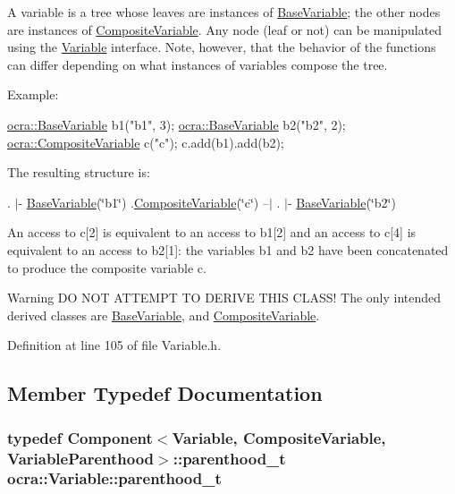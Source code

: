 A variable is a tree whose leaves are instances of \hyperlink{classocra_1_1BaseVariable}{Base\+Variable}; the other nodes are instances of \hyperlink{classocra_1_1CompositeVariable}{Composite\+Variable}. Any node (leaf or not) can be manipulated using the \hyperlink{classocra_1_1Variable}{Variable} interface. Note, however, that the behavior of the functions can differ depending on what instances of variables compose the tree.

Example\+: 
\begin{DoxyCode}
\hyperlink{classocra_1_1BaseVariable}{ocra::BaseVariable} b1(\textcolor{stringliteral}{"b1"}, 3);
\hyperlink{classocra_1_1BaseVariable}{ocra::BaseVariable} b2(\textcolor{stringliteral}{"b2"}, 2);
\hyperlink{classocra_1_1CompositeVariable}{ocra::CompositeVariable} c(\textcolor{stringliteral}{"c"});
c.add(b1).add(b2);
\end{DoxyCode}
 The resulting structure is\+:

. $\vert$-\/ \hyperlink{classocra_1_1BaseVariable}{Base\+Variable}(\char`\"{}b1\char`\"{}) .\hyperlink{classocra_1_1CompositeVariable}{Composite\+Variable}(\char`\"{}c\char`\"{}) --$\vert$ . $\vert$-\/ \hyperlink{classocra_1_1BaseVariable}{Base\+Variable}(\char`\"{}b2\char`\"{})

An access to c\mbox{[}2\mbox{]} is equivalent to an access to b1\mbox{[}2\mbox{]} and an access to c\mbox{[}4\mbox{]} is equivalent to an access to b2\mbox{[}1\mbox{]}\+: the variables b1 and b2 have been concatenated to produce the composite variable c.

\begin{DoxyWarning}{Warning}
DO N\+OT A\+T\+T\+E\+M\+PT TO D\+E\+R\+I\+VE T\+H\+IS C\+L\+A\+S\+S! The only intended derived classes are \hyperlink{classocra_1_1BaseVariable}{Base\+Variable}, and \hyperlink{classocra_1_1CompositeVariable}{Composite\+Variable}. 
\end{DoxyWarning}


Definition at line 105 of file Variable.\+h.



\subsection{Member Typedef Documentation}
\subsubsection[{\texorpdfstring{parenthood\+\_\+t}{parenthood_t}}]{\setlength{\rightskip}{0pt plus 5cm}typedef {\bf Component}$<${\bf Variable}, {\bf Composite\+Variable}, {\bf Variable\+Parenthood}$>$\+::{\bf parenthood\+\_\+t} {\bf ocra\+::\+Variable\+::parenthood\+\_\+t}}\hypertarget{classocra_1_1Variable_a88444b2124cf5aab069f46734822f31f}{}\label{classocra_1_1Variable_a88444b2124cf5aab069f46734822f31f}


